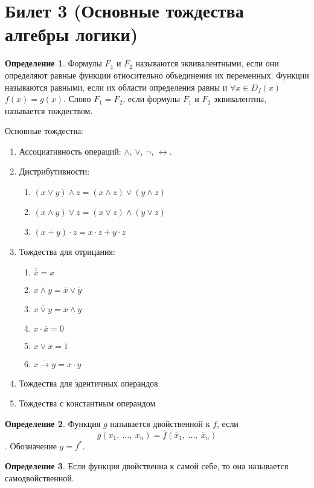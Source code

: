 \documentclass[a4paper, 12pt]{article}
\theoremstyle{definition}
\newtheorem*{definition}{Определение}
\theoremstyle{plain}
\theoremstyle{remark}
\begin{document}
  \section{Билет 3 (Основные тождества алгебры логики)}
  \begin{definition}
    Формулы $F_1$ и $F_2$ называются эквивалентными, если они определяют равные функции относительно объединения их переменных. Функции называются равными, если их области определения равны и $\forall x\in D_f(x)$ $f(x)=g(x)$. Слово $F_1=F_2$, если формулы $F_1$ и $F_2$ эквивалентны, называется тождеством. 
  \end{definition}
  Основные тождества:
  \begin{enumerate}
    \item Ассоциативность операций: $\wedge$, $\vee$, $\neg$, $\leftrightarrow$.
    \item Дистрибутивности:
    \begin{enumerate}
      \item $(x\vee y)\wedge z=(x\wedge z)\vee(y\wedge z)$
      \item $(x\wedge y)\vee z=(x\vee z)\wedge(y\vee z)$
      \item $(x+y)\cdot z=x\cdot z+y\cdot z$
    \end{enumerate}
    \item Тождества для отрицания: 
    \begin{enumerate}
      \item $\overline{\overline{x}}=x$
      \item $\overline{x\wedge y}=\overline{x}\vee \overline{y}$
      \item $\overline{x\vee y}=\overline{x}\wedge \overline{y}$
      \item $x\cdot\overline{x}=0$
      \item $x\vee\overline{x}=1$
      \item $\overline{x\rightarrow y}=x\cdot\overline{y}$
    \end{enumerate}
    \item Тождества для эдентичных операндов
    \item Тождества с константным операндом
  \end{enumerate}
  \begin{definition}
    Функция $g$ называется двойственной к $f$, если $$g(x_1, \ \ldots, \ x_n)=\overline{f}(\overline{x}_1, \ \ldots, \ \overline{x}_n)$$. Обозначение $g=f^*$.
  \end{definition}
  \begin{definition}
    Если функция двойственна к самой себе, то она называется самодвойственной.
  \end{definition}
\end{document}
